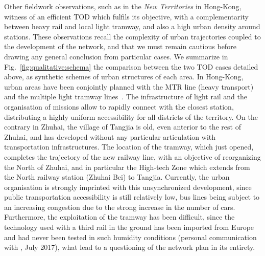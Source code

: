 Other fieldwork observations, such as in the \emph{New Territories} in Hong-Kong, witness of an efficient TOD which fulfils its objective, with a complementarity between heavy rail and local light tramway, and also a high urban density around stations. These observations recall the complexity of urban trajectories coupled to the development of the network, and that we must remain cautious before drawing any general conclusion from particular cases. We summarize in Fig.~\ref{fig:qualitative:schema} the comparison between the two TOD cases detailed above, as synthetic schemes of urban structures of each area. In Hong-Kong, urban areas have been conjointly planned with the MTR line (heavy transport) and the multiple light tramway lines~\citep{hui2005study}. The infrastructure of light rail and the organisation of missions allow to rapidly connect with the closest station, distributing a highly uniform accessibility for all districts of the territory. On the contrary in Zhuhai, the village of Tangjia is old, even anterior to the rest of Zhuhai, and has developed without any particular articulation with transportation infrastructures. The location of the tramway, which just opened, completes the trajectory of the new railway line, with an objective of reorganizing the North of Zhuhai, and in particular the High-tech Zone which extends from the North railway station (Zhuhai Bei) to Tangjia. Currently, the urban organisation is strongly imprinted with this unsynchronized development, since public transportation accessibility is still relatively low, bus lines being subject to an increasing congestion due to the strong increase in the number of cars. Furthermore, the exploitation of the tramway has been difficult, since the technology used with a third rail in the ground has been imported from Europe and had never been tested in such humidity conditions (personal communication with , July 2017), what lead to a questioning of the network plan in its entirety. 



